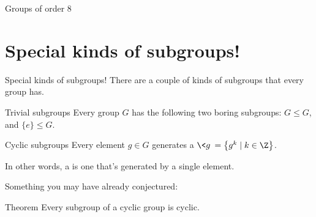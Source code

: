 \documentclass[8pt, handout]{beamer}
\newcommand{\Pause}{\pause}      %
\begin{document}
\begin{frame}{Groups of order $8$}
    
\end{frame}


\section{Special kinds of subgroups!}


\begin{frame}{Special kinds of subgroups!}
  There are a couple of kinds of subgroups that every group has. \Pause
  \begin{block}{Trivial subgroups}
    Every group $G$ has the following two boring subgroups: $G\leq G$, and $\{e\} \leq G$.
  \end{block}\Pause
  \begin{block}{Cyclic subgroups}
    Every element $g \in G$ generates a  $\<g\>=\big\{g^k\mid k\in\Z\big\}$.\Pause

    In other words, a  is one that's generated by a single element.
  \end{block}\Pause
  Something you may have already conjectured:
  \begin{block}{Theorem}
    Every subgroup of a cyclic group is cyclic.
  \end{block}
\end{frame}

\end{document}

